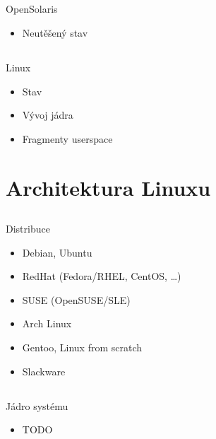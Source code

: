 \documentclass{beamer}
\begin{document}
\subsection{}
\begin{frame}{OpenSolaris}
\begin{itemize}
\item Neutěšený stav
\end{itemize}
\end{frame}

\subsection{}
\begin{frame}{Linux}
\begin{itemize}
\item Stav
\item Vývoj jádra
\item Fragmenty userspace
\end{itemize}
\end{frame}


\section{Architektura Linuxu}

\subsection{}
\begin{frame}{Distribuce}
\begin{itemize}
\item Debian, Ubuntu
\item RedHat (Fedora/RHEL, CentOS, \dots)
\item SUSE (OpenSUSE/SLE)
\item Arch Linux
\item Gentoo, Linux from scratch
\item Slackware
\end{itemize}
\end{frame}

\subsection{}
\begin{frame}{Jádro systému}
\begin{itemize}
\item TODO
\end{itemize}
\end{frame}
\end{document}

